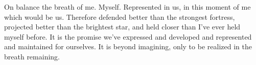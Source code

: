 

On balance the breath of me.  Myself.  Represented in us, in this
moment of me which would be us.  Therefore defended better than the
strongest fortress, projected better than the brightest star, and held
closer than I've ever held myself before.  It is the promise we've
expressed and developed and represented and \break maintained for ourselves.
It is beyond imagining, only to be realized in the breath remaining.

\bye
